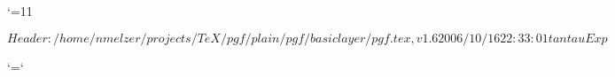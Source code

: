 %
%
%


\edef\pgfatcode{\the\catcode`\@}
\catcode`\@=11



\ProvidesPackageRCS $Header: /home/nmelzer/projects/TeX/pgf/plain/pgf/basiclayer/pgf.tex,v 1.6 2006/10/16 22:33:01 tantau Exp $









\catcode`\@=\pgfatcode

\endinput
